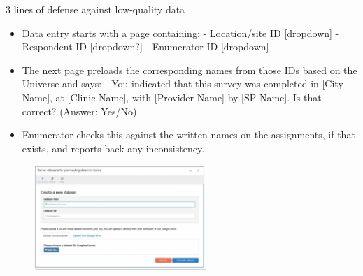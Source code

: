 \documentclass[aspectratio=169]{beamer}
\begin{document}
\begin{frame}[fragile]{3 lines of defense against low-quality data}
\begin{multicols}{2}	
	
	\begin{itemize}[<default overlay specification>]
		\item<1> Data entry starts with a page containing:
			\newline - Location/site ID [dropdown]
			\newline - Respondent ID [dropdown?]
			\newline - Enumerator ID [dropdown]
		\item<1> The next page preloads the corresponding names from those IDs based on the Universe and says: 
			\newline - You indicated that this survey was completed in [City Name], at [Clinic Name], with [Provider Name] by [SP Name]. Is that correct? (Answer: Yes/No)
		\item<1> Enumerator checks this against the written names on the assignments, if that exists, and reports back any inconsistency.
	\end{itemize}
	
	\begin{figure}
		\centering
		\includegraphics[width=65mm, right]{img/Survey2}
	\end{figure}
	
\end{multicols}
\end{frame}
\end{document}
